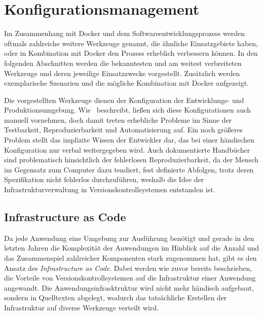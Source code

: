 \chapter{Konfigurationsmanagement}
\label{cha:konfigurationsmanagement}
Im Zusammenhang mit Docker und dem Softwareentwicklungsprozess werden oftmals zahlreiche weitere Werkzeuge genannt, die ähnliche Einsatzgebiete haben, oder in Kombination mit Docker den Prozess erheblich verbessern können.
In den folgenden Abschnitten werden die bekanntesten und am weitest verbreiteten Werkzeuge und deren jeweilige Einsatzzwecke vorgestellt.
Zusätzlich werden exemplarische Szenarien und die mögliche Kombination mit Docker aufgezeigt.

Die vorgestellten Werkzeuge dienen der Konfiguration der Entwicklungs- und Produktionsumgebung.
Wie~\autocite[29\psq]{Wolff201604} beschreibt, ließen sich diese Konfigurationen auch manuell vornehmen, doch damit treten erhebliche Probleme im Sinne der Testbarkeit, Reproduzierbarkeit und Automatisierung auf.
Ein noch größeres Problem stellt das implizite Wissen der Entwickler dar, das bei einer händischen Konfiguration nur verbal weitergegeben wird.
Auch dokumentierte Handbücher sind problematisch hinsichtlich der fehlerlosen Reproduzierbarkeit, da der Mensch im Gegensatz zum Computer dazu tendiert, fest definierte Abfolgen, trotz deren Spezifikation nicht fehlerlos durchzuführen, weshalb die Idee der Infrastrukturverwaltung in Versionskontrollsystemen entstanden ist.


\section{Infrastructure as Code}
\label{sec:infrastructureascode}
Da jede Anwendung eine Umgebung zur Ausführung benötigt und gerade in den letzten Jahren die Komplexität der Anwendungen im Hinblick auf die Anzahl und das Zusammenspiel zahlreicher Komponenten stark zugenommen hat, gibt es den Ansatz des \emph{Infrastructure as Code}.
Dabei werden wie zuvor bereits beschrieben, die Vorteile von Versionskontrollsystemen auf die Infrastruktur einer Anwendung angewandt.
Die Anwendungsinfrasktruktur wird nicht mehr händisch aufgebaut, sondern in Quelltexten abgelegt, wodurch das tatsächliche Erstellen der Infrastruktur auf diverse Werkzeuge verteilt wird.

